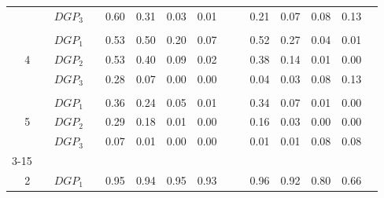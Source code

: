 \begin{table}[htbp]
{\begin{tabular}{cc|ccccccc|cccccc|}
    \multicolumn{2}{c|}{} & \multicolumn{1}{l}{$DGP_{3}$} & & \multicolumn{1}{c}{0.60} & \multicolumn{1}{c}{0.31} & \multicolumn{1}{c}{0.03} & \multicolumn{1}{c}{0.01} & & & \multicolumn{1}{c}{0.21} & \multicolumn{1}{c}{0.07} & \multicolumn{1}{c}{0.08} & \multicolumn{1}{c}{0.13} & \\
    & & & & & & & & & & & & & & \\
    \multicolumn{2}{c|}{\multirow{3}{*}{4}} & \multicolumn{1}{l}{$DGP_{1}$} & & \multicolumn{1}{c}{0.53} & \multicolumn{1}{c}{0.50} & \multicolumn{1}{c}{0.20} & \multicolumn{1}{c}{0.07} & & & \multicolumn{1}{c}{0.52} & \multicolumn{1}{c}{0.27} & \multicolumn{1}{c}{0.04} & \multicolumn{1}{c}{0.01} & \\
    \multicolumn{2}{c|}{} & \multicolumn{1}{l}{$DGP_{2}$} & & \multicolumn{1}{c}{0.53} & \multicolumn{1}{c}{0.40} & \multicolumn{1}{c}{0.09} & \multicolumn{1}{c}{0.02} & & & \multicolumn{1}{c}{0.38} & \multicolumn{1}{c}{0.14} & \multicolumn{1}{c}{0.01} & \multicolumn{1}{c}{0.00} & \\
    \multicolumn{2}{c|}{} & \multicolumn{1}{l}{$DGP_{3}$} & & \multicolumn{1}{c}{0.28} & \multicolumn{1}{c}{0.07} & \multicolumn{1}{c}{0.00} & \multicolumn{1}{c}{0.00} & & & \multicolumn{1}{c}{0.04} & \multicolumn{1}{c}{0.03} & \multicolumn{1}{c}{0.08} & \multicolumn{1}{c}{0.13} & \\
    & & & & & & & & & & & & & & \\
    \multicolumn{2}{c|}{\multirow{3}{*}{5}} & \multicolumn{1}{l}{$DGP_{1}$} & & \multicolumn{1}{c}{0.36} & \multicolumn{1}{c}{0.24} & \multicolumn{1}{c}{0.05} & \multicolumn{1}{c}{0.01} & & & \multicolumn{1}{c}{0.34} & \multicolumn{1}{c}{0.07} & \multicolumn{1}{c}{0.01} & \multicolumn{1}{c}{0.00} & \\
    \multicolumn{2}{c|}{} & \multicolumn{1}{l}{$DGP_{2}$} & & \multicolumn{1}{c}{0.29} & \multicolumn{1}{c}{0.18} & \multicolumn{1}{c}{0.01} & \multicolumn{1}{c}{0.00} & & & \multicolumn{1}{c}{0.16} & \multicolumn{1}{c}{0.03} & \multicolumn{1}{c}{0.00} & \multicolumn{1}{c}{0.00} & \\
    \multicolumn{2}{c|}{} & \multicolumn{1}{l}{$DGP_{3}$} & & \multicolumn{1}{c}{0.07} & \multicolumn{1}{c}{0.01} & \multicolumn{1}{c}{0.00} & \multicolumn{1}{c}{0.00} & & & \multicolumn{1}{c}{0.01} & \multicolumn{1}{c}{0.01} & \multicolumn{1}{c}{0.08} & \multicolumn{1}{c}{0.08} & \\
    \cmidrule{3-15}
    & & & & & & & & & & & & & & \\
    \multicolumn{2}{c|}{\multirow{3}{*}{2}} & \multicolumn{1}{l}{$DGP_{1}$} & & \multicolumn{1}{c}{0.95} & \multicolumn{1}{c}{0.94} & \multicolumn{1}{c}{0.95} & \multicolumn{1}{c}{0.93} & & & \multicolumn{1}{c}{0.96} & \multicolumn{1}{c}{0.92} & \multicolumn{1}{c}{0.80} & \multicolumn{1}{c}{0.66} & \\

\end{tabular}}
\end{table}

